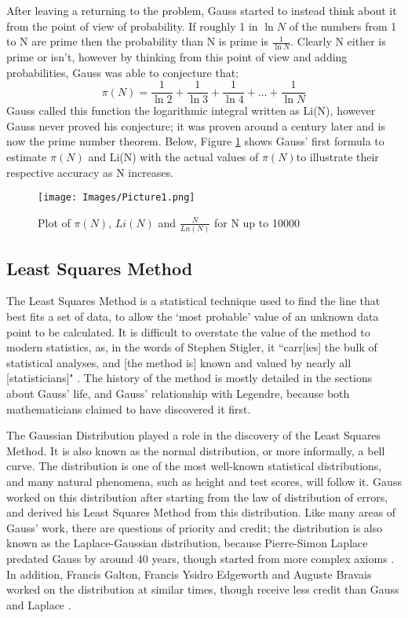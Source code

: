 \documentclass{article}
\begin{document}
After leaving a returning to the problem, Gauss started to instead think about it from the point of view of probability. If roughly 1 in $\ln{N}$ of the numbers from 1 to N are prime then the probability than N is prime is $\frac{1}{\ln{N}}$\cite{musicofprimes}. Clearly N either is prime or isn't, however by thinking from this point of view and adding probabilities, Gauss was able to conjecture that:
\begin{equation}
    \pi (N) = \frac{1}{\ln{2}} + \frac{1}{\ln{3}} + \frac{1}{\ln{4}} + ... + \frac{1}{\ln{N}}
\end{equation}
Gauss called this function the logarithmic integral written as Li(N)\cite{musicofprimes}, however Gauss never proved his conjecture; it was proven around a century later and is now the prime number theorem. Below, Figure \ref{plotofpi} shows Gauss' first formula to estimate $\pi(N)$ and Li(N) with the actual values of $\pi (N)$to illustrate their respective accuracy as N increases.
\begin{figure}[H]
  \centering
  \texttt{[image: Images/Picture1.png]}
  \caption{Plot of $\pi(N)$, $Li(N)$ and $\frac{N}{Ln(N)}$ for N up to 10000}
  \label{plotofpi}
\end{figure}
\subsection{Least Squares Method}

The Least Squares Method is a statistical technique used to find the line that best fits a set of data, to allow the `most probable' value of an unknown data point to be calculated. It is difficult to overstate the value of the method to modern statistics, as, in the words of Stephen Stigler, it ``carr[ies] the bulk of statistical analyses, and [the method is] known and valued by nearly all [statisticians]" \cite{stigler}. The history of the method is mostly detailed in the sections about Gauss' life, and Gauss' relationship with Legendre, because both mathematicians claimed to have discovered it first.

The Gaussian Distribution played a role in the discovery of the Least Squares Method. It is also known as the normal distribution, or more informally, a bell curve. The distribution is one of the most well-known statistical distributions, and many natural phenomena, such as height and test scores, will follow it. Gauss worked on this distribution after starting from the law of distribution of errors, and derived his Least Squares Method from this distribution. Like many areas of Gauss' work, there are questions of priority and credit; the distribution is also known as the Laplace-Gaussian distribution, because Pierre-Simon Laplace predated Gauss by around 40 years, though started from more complex axioms \cite{distribution}. In addition, Francis Galton, Francis Ysidro Edgeworth and Auguste Bravais worked on the distribution at similar times, though receive less credit than Gauss and Laplace \cite{distribution}.
\end{document}
